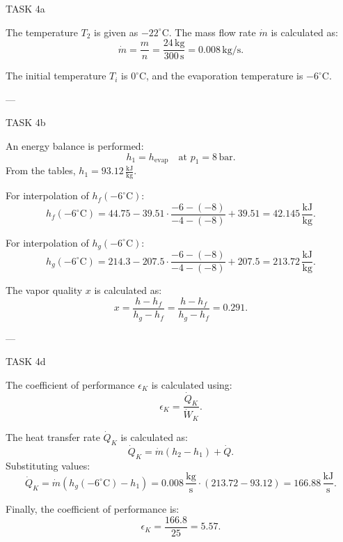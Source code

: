 TASK 4a

The temperature \( T_2 \) is given as \( -22^\circ\text{C} \). The mass flow rate \( \dot{m} \) is calculated as:
\[
\dot{m} = \frac{m}{n} = \frac{24 \, \text{kg}}{300 \, \text{s}} = 0.008 \, \text{kg/s}.
\]

The initial temperature \( T_i \) is \( 0^\circ\text{C} \), and the evaporation temperature is \( -6^\circ\text{C} \).

---

TASK 4b

An energy balance is performed:
\[
h_1 = h_{\text{evap}} \quad \text{at } p_1 = 8 \, \text{bar}.
\]
From the tables, \( h_1 = 93.12 \, \frac{\text{kJ}}{\text{kg}} \).

For interpolation of \( h_f(-6^\circ\text{C}) \):
\[
h_f(-6^\circ\text{C}) = 44.75 - 39.51 \cdot \frac{-6 - (-8)}{-4 - (-8)} + 39.51 = 42.145 \, \frac{\text{kJ}}{\text{kg}}.
\]

For interpolation of \( h_g(-6^\circ\text{C}) \):
\[
h_g(-6^\circ\text{C}) = 214.3 - 207.5 \cdot \frac{-6 - (-8)}{-4 - (-8)} + 207.5 = 213.72 \, \frac{\text{kJ}}{\text{kg}}.
\]

The vapor quality \( x \) is calculated as:
\[
x = \frac{h - h_f}{h_g - h_f} = \frac{h - h_f}{h_g - h_f} = 0.291.
\]

---

TASK 4d

The coefficient of performance \( \epsilon_K \) is calculated using:
\[
\epsilon_K = \frac{\dot{Q}_K}{\dot{W}_K}.
\]

The heat transfer rate \( \dot{Q}_K \) is calculated as:
\[
\dot{Q}_K = \dot{m}(h_2 - h_1) + \dot{Q}.
\]
Substituting values:
\[
\dot{Q}_K = \dot{m}(h_g(-6^\circ\text{C}) - h_1) = 0.008 \, \frac{\text{kg}}{\text{s}} \cdot (213.72 - 93.12) = 166.88 \, \frac{\text{kJ}}{\text{s}}.
\]

Finally, the coefficient of performance is:
\[
\epsilon_K = \frac{166.8}{25} = 5.57.
\]